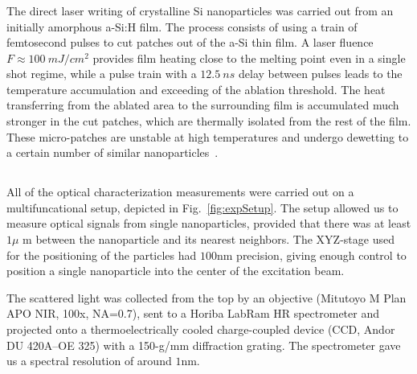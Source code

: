         \subsubsection{}
                The direct laser writing of crystalline Si nanoparticles was carried out from an initially amorphous a-Si:H film.
            The process consists of using a train of femtosecond pulses to cut patches out of the a-Si thin film\cite{makarov2016controllable,
            dmitriev2016direct}. A laser fluence $F\approx100~\si{mJ/cm^{2}}$ provides film heating close to the melting point even in a
            single shot regime, while a pulse train with a $12.5~\si{ns}$ delay between pulses leads to the temperature accumulation
            and exceeding of the ablation threshold. The heat transferring from the ablated area to the surrounding film is accumulated
            much stronger in the cut patches, which are thermally isolated from the rest of the film.
            These micro-patches are unstable at high temperatures and undergo dewetting to a certain number of similar
            nanoparticles~\cite{thompson2012solid}.


    \subsection{}
            All of the optical characterization measurements were carried out on a multifuncational setup, depicted in
            Fig.~\ref{fig:expSetup}. The setup allowed us to measure optical signals from single nanoparticles, provided that
            there was at least $1\mu$ m between the nanoparticle and its nearest neighbors. The XYZ-stage used for the
            positioning of the particles had $100$nm precision, giving enough control to position a single nanoparticle into
            the center of the excitation beam.

            The scattered light was collected from the top by an objective (Mitutoyo M Plan APO NIR, 100x, NA=0.7),
            sent to a Horiba LabRam HR spectrometer and projected onto a thermoelectrically cooled charge-coupled device
            (CCD, Andor DU 420A--OE 325) with a 150-g/mm diffraction grating. The spectrometer gave us a spectral resolution
            of around $1$nm.

